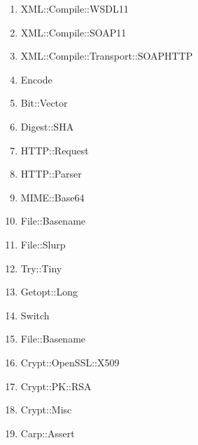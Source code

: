 \begin{enumerate}
	\item XML::Compile::WSDL11
	\item XML::Compile::SOAP11
	\item XML::Compile::Transport::SOAPHTTP
	\item Encode
	\item Bit::Vector
	\item Digest::SHA
	\item HTTP::Request
	\item HTTP::Parser
	\item MIME::Base64
	\item File::Basename
	\item File::Slurp
	\item Try::Tiny
	\item Getopt::Long
	\item Switch
	\item File::Basename
	\item Crypt::OpenSSL::X509
	\item Crypt::PK::RSA
	\item Crypt::Misc
	\item Carp::Assert
\end{enumerate}
